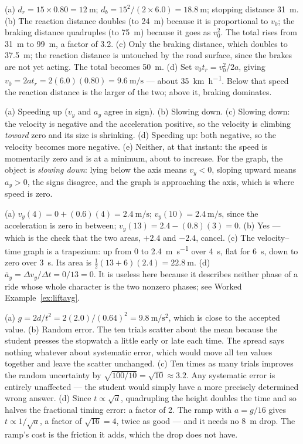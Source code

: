 \documentclass[11pt,twoside,openany]{book}
\newcounter{check}[chapter]
\begin{document}
\begin{description}[leftmargin=2em,itemsep=2pt]
  \item[2.8] (a) $d_r = 15 \times 0.80 = \SI{12}{\metre}$; $d_b = 15^2/(2\times 6.0) = \SI{18.8}{\metre}$; stopping distance \SI{31}{\metre}. (b) The reaction distance doubles (to \SI{24}{\metre}) because it is proportional to $v_0$; the braking distance quadruples (to \SI{75}{\metre}) because it goes as $v_0^2$. The total rises from \SI{31}{\metre} to \SI{99}{\metre}, a factor of \num{3.2}. (c) Only the braking distance, which doubles to \SI{37.5}{\metre}; the reaction distance is untouched by the road surface, since the brakes are not yet acting. The total becomes \SI{50}{\metre}. (d) Set $v_0 t_r = v_0^2/2a$, giving $v_0 = 2at_r = 2(6.0)(0.80) = \SI{9.6}{\metre\per\second}$ --- about \SI{35}{\kilo\metre\per\hour}. Below that speed the reaction distance is the larger of the two; above it, braking dominates.
  \item[2.9] (a) Speeding up ($v_y$ and $a_y$ agree in sign). (b) Slowing down. (c) Slowing down: the velocity is negative and the acceleration positive, so the velocity is climbing \emph{toward} zero and its size is shrinking. (d) Speeding up: both negative, so the velocity becomes more negative. (e) Neither, at that instant: the speed is momentarily zero and is at a minimum, about to increase. For the graph, the object is \emph{slowing down}: lying below the axis means $v_y < 0$, sloping upward means $a_y > 0$, the signs disagree, and the graph is approaching the axis, which is where speed is zero.
  \item[2.10] (a) $v_y(4) = 0 + (0.6)(4) = \SI{2.4}{\metre\per\second}$; $v_y(10) = \SI{2.4}{\metre\per\second}$, since the acceleration is zero in between; $v_y(13) = 2.4 - (0.8)(3) = 0$. (b) Yes --- which is the check that the two areas, $+2.4$ and $-2.4$, cancel. (c) The velocity--time graph is a trapezium: up from $0$ to \SI{2.4}{\metre\per\second} over \SI{4}{\second}, flat for \SI{6}{\second}, down to zero over \SI{3}{\second}. Its area is $\tfrac12(13 + 6)(2.4) = \SI{22.8}{\metre}$. (d) $\bar a_y = \Delta v_y/\Delta t = 0/13 = 0$. It is useless here because it describes neither phase of a ride whose whole character is the two nonzero phases; see Worked Example~\ref{ex:liftavg}.
  \item[2.11] (a) $g = 2d/t^2 = 2(2.0)/(0.64)^2 = \SI{9.8}{\metre\per\second\squared}$, which is close to the accepted value. (b) Random error. The ten trials scatter about the mean because the student presses the stopwatch a little early or late each time. The spread says nothing whatever about systematic error, which would move all ten values together and leave the scatter unchanged. (c) Ten times as many trials improves the random uncertainty by $\sqrt{100/10} = \sqrt{10} \approx 3.2$. Any systematic error is entirely unaffected --- the student would simply have a more precisely determined wrong answer. (d) Since $t \propto \sqrt{d}$, quadrupling the height doubles the time and so halves the fractional timing error: a factor of \num{2}. The ramp with $a = g/16$ gives $t \propto 1/\sqrt{a}$, a factor of $\sqrt{16} = 4$, twice as good --- and it needs no \SI{8}{\metre} drop. The ramp's cost is the friction it adds, which the drop does not have.
\end{description}
\end{document}
